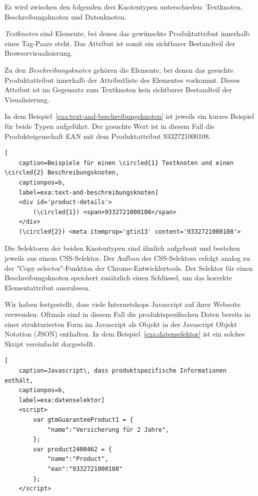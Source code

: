 Es wird zwischen den folgenden drei Knotentypen unterschieden: Textknoten, Beschreibungsknoten und Datenknoten.

\textit{Textknoten} sind Elemente, bei denen das gewünschte Produktattribut innerhalb eines Tag-Paars steht.
Das Attribut ist somit ein sichtbarer Bestandteil der Browservisualisierung.

Zu den \textit{Beschreibungsknoten} gehören die Elemente, bei denen das gesuchte Produktattribut innerhalb der
Attributliste des Elementes vorkommt.
Dieses Attribut ist im Gegensatz zum Textknoten kein sichtbarer Bestandteil der Visualisierung.

In dem Beispiel~\ref{exa:text-and-beschreibungsknoten} ist jeweils ein kurzes Beispiel für beide Typen aufgeführt.
Der gesuchte Wert ist in diesem Fall die Produkteigenschaft EAN mit dem Produktattribut 9332721000108.

\begin{lstlisting}[
    caption=Beispiele für einen \circled{1} Textknoten und einen \circled{2} Beschreibungsknoten,
    captionpos=b,
    label=exa:text-and-beschreibungsknoten]
    <div id='product-details'>
        (\circled{1}) <span>9332721000108</span>
    </div>
    (\circled{2}) <meta itemprop='gtin13' content='9332721000108'>
\end{lstlisting}

Die Selektoren der beiden Knotentypen sind ähnlich aufgebaut und bestehen jeweils aus einem CSS-Selektor.
Der Aufbau des CSS-Selektors erfolgt analog zu der "Copy selector"-Funktion der Chrome-Entwicklertools.
Der Selektor für einen Beschreibungsknoten speichert zusätzlich einen Schlüssel, um das korrekte Elementattribut
auszulesen.

Wir haben festgestellt, dass viele Internetshops Javascript auf ihrer Webseite verwenden.
Oftmals sind in diesem Fall die produktspezifischen Daten bereits in einer strukturierten Form im Javascript
als Objekt in der Javascript Objekt Notation (JSON) enthalten.
In dem Beispiel~\ref{exa:datenselektor} ist ein solches Skript vereinfacht dargestellt.

\begin{lstlisting}[
    caption=Javascript\, dass produktspezifische Informationen enthält,
    captionpos=b,
    label=exa:datenselektor]
    <script>
        var gtmGuaranteeProduct1 = {
            "name":"Versicherung für 2 Jahre",
        };
        var product2400462 = {
            "name":"Product",
            "ean":"9332721000108"
        };
    </script>
\end{lstlisting}

